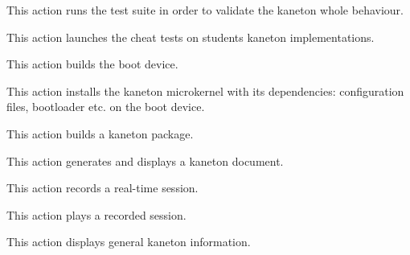 	{
	  This action runs the test suite in order to validate the kaneton
	  whole behaviour.

	  \-

	}

	{
	  This action launches the cheat tests on students kaneton
	  implementations.

	  \-


	  \-

	}

	{
	  This action builds the boot device.

	  \-

	}

	{
	  This action installs the kaneton microkernel with its dependencies:
	  configuration files, bootloader etc. on the boot device.

	  \-

	}

	{
	  This action builds a kaneton package.

	  \-


	  \-

	}

	{
	  This action generates and displays a kaneton document.

	  \-


	  \-


	  \-

	}

	{
	  This action records a real-time session.

	  \-


	  \-

	}

	{
	  This action plays a recorded session.

	  \-


	  \-


	  \-

	}

	{
	  This action displays general kaneton information.

	  \-

	}
